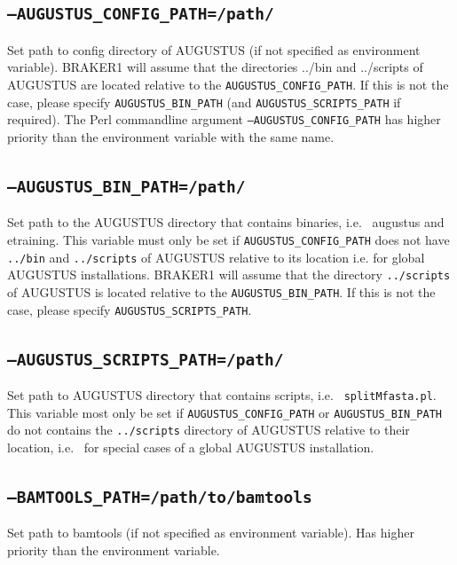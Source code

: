 \documentclass[a4paper,10pt]{report}
\begin{document}
\subsection{\texttt{--AUGUSTUS\_CONFIG\_PATH=/path/}}
Set path to config directory of AUGUSTUS (if not specified as 
                                         environment variable). BRAKER1 will assume that the directories
                                         ../bin and ../scripts of AUGUSTUS are located relative to
                                         the \texttt{AUGUSTUS\_CONFIG\_PATH}. If this is not the case, please
                                         specify \texttt{AUGUSTUS\_BIN\_PATH} (and \texttt{AUGUSTUS\_SCRIPTS\_PATH} if required).
                                         The Perl commandline argument \texttt{--AUGUSTUS\_CONFIG\_PATH} has higher
                                         priority than the environment variable with the same name.
                                         
\subsection{\texttt{--AUGUSTUS\_BIN\_PATH=/path/}}           Set path to the AUGUSTUS directory that contains binaries, i.e.~
    					 augustus and etraining. This variable must only be set if 
    					 \texttt{AUGUSTUS\_CONFIG\_PATH} does not have \texttt{../bin} and \texttt{../scripts} of
    					 AUGUSTUS relative to its location i.e. for global AUGUSTUS 
    					 installations. BRAKER1 will assume that the directory
    					 \texttt{../scripts} of AUGUSTUS is located relative to the \texttt{AUGUSTUS\_BIN\_PATH}.
If this is not the case, please specify \texttt{AUGUSTUS\_SCRIPTS\_PATH}.

\subsection{\texttt{--AUGUSTUS\_SCRIPTS\_PATH=/path/}}       Set path to AUGUSTUS directory that contains scripts, i.e.~
    				         \texttt{splitMfasta.pl}. This variable most only be set if
    				         \texttt{AUGUSTUS\_CONFIG\_PATH} or \texttt{AUGUSTUS\_BIN\_PATH} do not contains the
    				         \texttt{../scripts} directory of AUGUSTUS relative to their location, i.e.~
    				         for special cases of a global AUGUSTUS installation.
    				         
\subsection{\texttt{--BAMTOOLS\_PATH=/path/to/bamtools}}
Set path to bamtools (if not specified as environment 
variable). Has higher priority than the environment variable.
\end{document}
